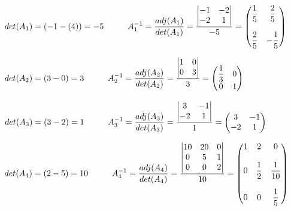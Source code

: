 \documentclass[fleqn]{article}
\begin{document}
\begin{enumerate}
      \textcolor{hwColor}{
        $
        det(A_1)=(-1-(4))=-5
        \hskip 1truecm
        A_1^{-1}=\dfrac{adj(A_1)}{det(A_1)}=\dfrac{
          \begin{vmatrix}
            -1 & -2 \\
            -2 & 1
          \end{vmatrix}
        }{-5}=\begin{pmatrix}
          \dfrac{1}{5} & \dfrac{2}{5} \\
          \\
          \dfrac{2}{5} & -\dfrac{1}{5} \\
        \end{pmatrix}
        $
      }

      \textcolor{hwColor}{
        $
        det(A_2)=(3-0)=3
        \hskip 1truecm
        A_2^{-1}=\dfrac{adj(A_2)}{det(A_2)}=\dfrac{
          \begin{vmatrix}
            1 & 0 \\
            0 & 3
          \end{vmatrix}
        }{3}=\begin{pmatrix}
          \dfrac{1}{3} & 0 \\
          0 & 1 \\
        \end{pmatrix}
        $
      }

      \textcolor{hwColor}{
        $
        det(A_3)=(3-2)=1
        \hskip 1truecm
        A_3^{-1}=\dfrac{adj(A_3)}{det(A_3)}=\dfrac{
          \begin{vmatrix}
            3 & -1 \\
            -2 & 1 \\
          \end{vmatrix}
        }{1}=
        \begin{pmatrix}
          3 & -1 \\
          -2 & 1 \\
        \end{pmatrix}
        $
      }

      \textcolor{hwColor}{
        $
        det(A_4)=(2-5)=10
        \hskip 1truecm
        A_4^{-1}=\dfrac{adj(A_4)}{det(A_4)}=\dfrac{
          \begin{vmatrix}
           10 & 20 & 0 \\
           0 & 5 & 1 \\
           0 & 0 & 2 \\
          \end{vmatrix}
        }{10}=\begin{pmatrix}
          1 & 2 & 0 \\
          \\
          0 & \dfrac{1}{2}& \dfrac{1}{10} \\
          \\
          0 & 0 & \dfrac{1}{5}\\
        \end{pmatrix}
        $
      }


\end{enumerate}
\end{document}
